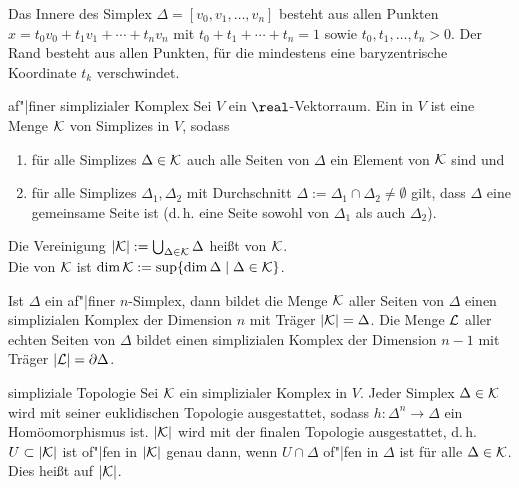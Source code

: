 \begin{Bem}
    Das Innere des Simplex $\Delta = [v_0, v_1, \dotsc, v_n]$ besteht aus
    allen Punkten \\
    $x = t_0 v_0 + t_1 v_1 + \dotsb + t_n v_n$ mit
    $t_0 + t_1 + \dotsb + t_n = 1$ sowie $t_0, t_1, \dotsc, t_n > 0$.
    Der Rand besteht aus allen Punkten, für die mindestens eine baryzentrische
    Koordinate $t_k$ verschwindet.
\end{Bem}

\linie

\begin{Def}{af"|finer simplizialer Komplex}
    Sei $V$ ein $\real$-Vektorraum.
    Ein  in $V$ ist eine Menge
    $\mathcal{K}$ von Simplizes in $V$, sodass
    \begin{enumerate}
        \item
        für alle Simplizes $\Delta \in \mathcal{K}$
        auch alle Seiten von $\Delta$ ein Element von $\mathcal{K}$ sind und

        \item
        für alle Simplizes $\Delta_1, \Delta_2$ mit Durchschnitt
        $\Delta := \Delta_1 \cap \Delta_2 \not= \emptyset$
        gilt, dass $\Delta$ eine gemeinsame Seite ist
        (d.\,h. eine Seite sowohl von $\Delta_1$ als auch $\Delta_2$).
    \end{enumerate}
    Die Vereinigung $|\mathcal{K}| := \bigcup_{\Delta \in \mathcal{K}} \Delta$ heißt
     von $\mathcal{K}$. \\
    Die  von $\mathcal{K}$ ist
    $\dim \mathcal{K} := \sup\{\dim \Delta \;|\; \Delta \in \mathcal{K}\}$.
\end{Def}

\begin{Bsp}
    Ist $\Delta$ ein af"|finer $n$-Simplex, dann bildet die Menge $\mathcal{K}$ aller
    Seiten von $\Delta$ einen simplizialen Komplex der Dimension $n$
    mit Träger $|\mathcal{K}| = \Delta$.
    Die Menge $\mathcal{L}$ aller echten Seiten von $\Delta$ bildet einen simplizialen
    Komplex der Dimension $n - 1$ mit Träger $|\mathcal{L}| = \partial \Delta$.
\end{Bsp}

\pagebreak

\begin{Def}{simpliziale Topologie}
    Sei $\mathcal{K}$ ein simplizialer Komplex in $V$.
    Jeder Simplex $\Delta \in \mathcal{K}$ wird mit seiner euklidischen Topologie
    ausgestattet, sodass $h\colon \Delta^n \rightarrow \Delta$
    ein Homöomorphismus ist.
    $|\mathcal{K}|$ wird mit der finalen Topologie ausgestattet, d.\,h.
    $U \subset |\mathcal{K}|$ ist of"|fen in $|\mathcal{K}|$ genau dann, wenn $U \cap \Delta$
    of"|fen in $\Delta$ ist für alle $\Delta \in \mathcal{K}$.
    Dies heißt  auf $|\mathcal{K}|$.
\end{Def}


